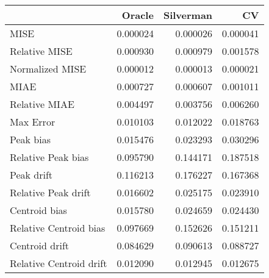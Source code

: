 \begin{tabular}{lrrr}
  \hline
 & Oracle & Silverman & CV \\ 
  \hline
MISE & 0.000024 & 0.000026 & 0.000041 \\ 
  Relative MISE & 0.000930 & 0.000979 & 0.001578 \\ 
  Normalized MISE & 0.000012 & 0.000013 & 0.000021 \\ 
  MIAE & 0.000727 & 0.000607 & 0.001011 \\ 
  Relative MIAE & 0.004497 & 0.003756 & 0.006260 \\ 
  Max Error & 0.010103 & 0.012022 & 0.018763 \\ 
  Peak bias & 0.015476 & 0.023293 & 0.030296 \\ 
  Relative Peak bias & 0.095790 & 0.144171 & 0.187518 \\ 
  Peak drift & 0.116213 & 0.176227 & 0.167368 \\ 
  Relative Peak drift & 0.016602 & 0.025175 & 0.023910 \\ 
  Centroid bias & 0.015780 & 0.024659 & 0.024430 \\ 
  Relative Centroid bias & 0.097669 & 0.152626 & 0.151211 \\ 
  Centroid drift & 0.084629 & 0.090613 & 0.088727 \\ 
  Relative Centroid drift & 0.012090 & 0.012945 & 0.012675 \\ 
   \hline
\end{tabular}
